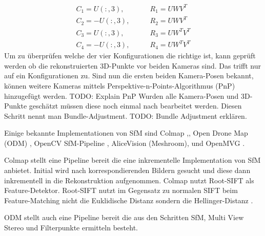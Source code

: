 \documentclass[12pt,titlepage, twoside]{article}
\begin{document}
\begin{equation}
    \label{eq:sfm:camera:pose}
    \begin{split}
    C_1=U(:,3),&\qquad R_1=UWV^T \\
    C_2=-U(:,3),&\qquad R_2=UWV^T \\
    C_3=U(:,3),&\qquad R_3=UW^TV^T \\
    C_4=-U(:,3),&\qquad R_4=UW^TV^T
    \end{split}
\end{equation}
Um zu überprüfen welche der vier Konfigurationen die richtige ist, kann geprüft werden ob die rekonstruierten 3D-Punkte vor beiden Kameras sind. Das trifft nur auf ein Konfigurationen zu.
Sind nun die ersten beiden Kamera-Posen bekannt, können weitere Kameras mittels Perspektive-n-Points-Algorithmus (PnP) hinzugefügt werden. 
TODO: Explain PnP
Wurden alle Kamera-Posen und 3D-Punkte geschätzt müssen diese noch einmal nach bearbeitet werden. Diesen Schritt nennt man Bundle-Adjustment.
TODO: Bundle Adjustment erklären.



Einige bekannte Implementationen von SfM sind Colmap \cite{schoenberger2016sfm},\cite{schoenberger2016mvs}, Open Drone Map (ODM) \cite{ODM}, OpenCV SfM-Pipeline \cite{opencv}, AliceVision (Meshroom)\cite{Moulon2012},\cite{Jancosek2011} und OpenMVG \cite{moulon2016openmvg}.

Colmap stellt eine Pipeline bereit die eine inkrementelle Implementation von SfM anbietet. Initial wird nach korrespondierenden Bildern gesucht und diese dann inkrementell in die Rekonstruktion aufgenommen.
Colmap nutzt Root-SIFT als Feature-Detektor. Root-SIFT nutzt im Gegensatz zu normalen SIFT beim Feature-Matching nicht die Euklidische Distanz sondern die Hellinger-Distanz \cite{arandjelovic2012three}.

ODM stellt auch eine Pipeline bereit die aus den Schritten SfM, Multi View Stereo und Filterpunkte ermitteln besteht. 
\end{document}
